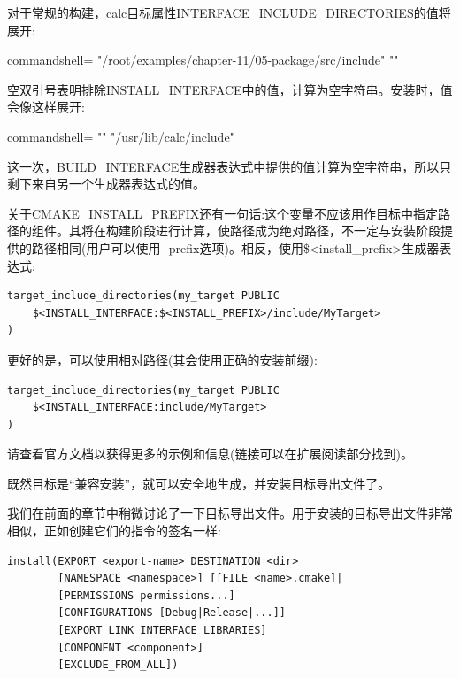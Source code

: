 对于常规的构建，calc目标属性INTERFACE\_INCLUDE\_DIRECTORIES的值将展开:

\begin{tcblisting}{commandshell={}}
"/root/examples/chapter-11/05-package/src/include" ""
\end{tcblisting}

空双引号表明排除INSTALL\_INTERFACE中的值，计算为空字符串。安装时，值会像这样展开:

\begin{tcblisting}{commandshell={}}
"" "/usr/lib/calc/include"
\end{tcblisting}

这一次，BUILD\_INTERFACE生成器表达式中提供的值计算为空字符串，所以只剩下来自另一个生成器表达式的值。

关于CMAKE\_INSTALL\_PREFIX还有一句话:这个变量不应该用作目标中指定路径的组件。其将在构建阶段进行计算，使路径成为绝对路径，不一定与安装阶段提供的路径相同(用户可以使用-{}-prefix选项)。相反，使用\$<install\_prefix>生成器表达式:

\begin{lstlisting}[style=styleCMake]
target_include_directories(my_target PUBLIC
	$<INSTALL_INTERFACE:$<INSTALL_PREFIX>/include/MyTarget>
)
\end{lstlisting}

更好的是，可以使用相对路径(其会使用正确的安装前缀):

\begin{lstlisting}[style=styleCMake]
target_include_directories(my_target PUBLIC
	$<INSTALL_INTERFACE:include/MyTarget>
)
\end{lstlisting}

请查看官方文档以获得更多的示例和信息(链接可以在扩展阅读部分找到)。

既然目标是“兼容安装”，就可以安全地生成，并安装目标导出文件了。


我们在前面的章节中稍微讨论了一下目标导出文件。用于安装的目标导出文件非常相似，正如创建它们的指令的签名一样:

\begin{lstlisting}[style=styleCMake]
install(EXPORT <export-name> DESTINATION <dir>
		[NAMESPACE <namespace>] [[FILE <name>.cmake]|
		[PERMISSIONS permissions...]
		[CONFIGURATIONS [Debug|Release|...]]
		[EXPORT_LINK_INTERFACE_LIBRARIES]
		[COMPONENT <component>]
		[EXCLUDE_FROM_ALL])
\end{lstlisting}

